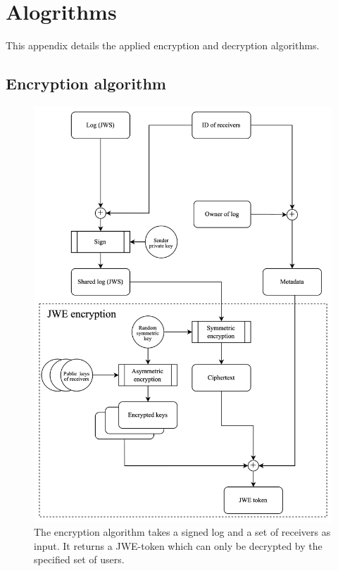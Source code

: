\documentclass[../main.tex]{subfiles}
\begin{document}
\chapter{Alogrithms}

This appendix details the applied encryption and decryption algorithms.

\section{Encryption algorithm}
\label{app:encryption}
\begin{figure}[h]
    \includegraphics[scale=0.13]{../img/05/encrypt_logs.jpg}
    \centering
    \caption[Encryption algorithm]{The encryption algorithm takes a signed log and a set of receivers as input. It returns a JWE-token which can only be decrypted by the specified set of users.}
    \label{app:encryption_algo}
\end{figure}
\newpage
\end{document}
